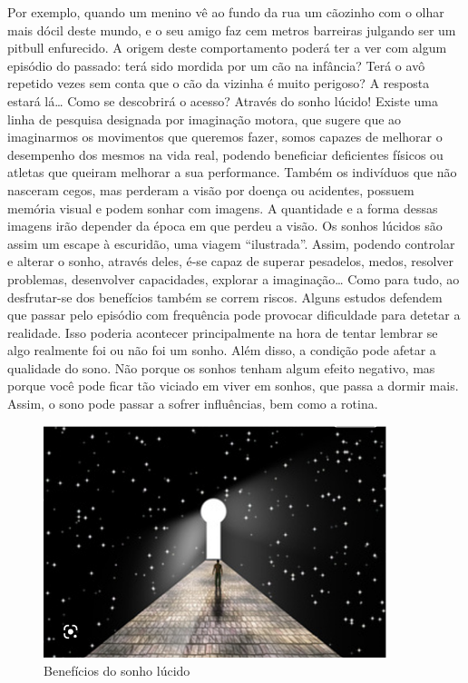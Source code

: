 \documentclass{report}
\begin{document}
Por exemplo, quando um menino vê ao fundo da rua um cãozinho com o olhar mais dócil deste mundo, e o seu amigo faz cem metros barreiras julgando ser um pitbull enfurecido. A origem deste comportamento poderá ter a ver com algum episódio do passado: terá sido mordida por um cão na infância? Terá o avô repetido vezes sem conta que o cão da vizinha é muito perigoso? A resposta estará lá… Como se descobrirá o acesso? Através do sonho lúcido!
Existe uma linha de pesquisa designada por imaginação motora, que sugere que ao imaginarmos os movimentos que queremos fazer, somos capazes de melhorar o desempenho dos mesmos na vida real, podendo beneficiar deficientes físicos ou atletas que queiram melhorar a sua performance.
Também os indivíduos que não nasceram cegos, mas perderam a visão por doença ou acidentes, possuem memória visual e podem sonhar com imagens. A quantidade e a forma dessas imagens irão depender da época em que perdeu a visão. Os sonhos lúcidos são assim um escape à escuridão, uma viagem “ilustrada”.
Assim, podendo controlar e alterar o sonho, através deles, é-se capaz de superar pesadelos, medos, resolver problemas, desenvolver capacidades, explorar a imaginação…
Como para tudo, ao desfrutar-se dos benefícios também se correm riscos. Alguns estudos defendem que passar pelo episódio com frequência pode provocar dificuldade para detetar a realidade. Isso poderia acontecer principalmente na hora de tentar lembrar se algo realmente foi ou não foi um sonho.
Além disso, a condição pode afetar a qualidade do sono. Não porque os sonhos tenham algum efeito negativo, mas porque você pode ficar tão viciado em viver em sonhos, que passa a dormir mais. Assim, o sono pode passar a sofrer influências, bem como a rotina.

\begin{figure}[h]
\center %
\includegraphics[width=100mm]{sonholucidooo.png}
\caption{Benefícios do sonho lúcido}
\label{fig:lucido}
\end{figure}
\end{document}
